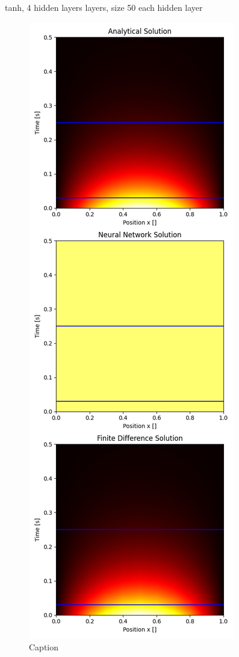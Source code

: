 tanh, 4 hidden layers layers, size 50 each hidden layer

\begin{figure}
    \centering
    \includegraphics[width=1.0\linewidth]{project_3/plots/heat_map_comparison.png}
    \caption{Caption}
    \label{fig:enter-label}
\end{figure}

